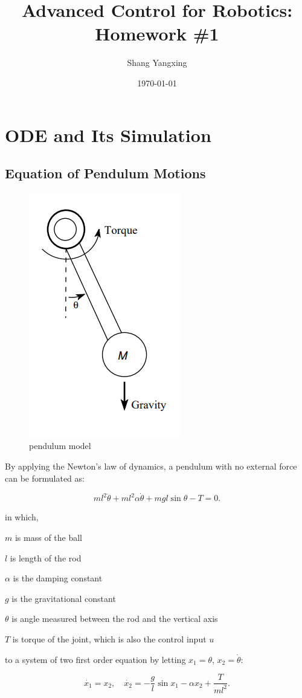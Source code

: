 \documentclass{article}
\title{\textbf{Advanced Control for Robotics: Homework \#1}}
\author{Shang Yangxing}
\date{\today}
\begin{document}
\maketitle
\tableofcontents

\section{ODE and Its Simulation}

\subsection{Equation of Pendulum Motions}

\begin{figure}[htbp]
    \centering
    \includegraphics[width=.2\textwidth]{img/pendulum.png}
    \caption{pendulum model}
    \label{fig:pendulum}
\end{figure}

By applying the Newton's law of dynamics, a pendulum with no external force can be formulated as:

\begin{equation}
    ml^2 \ddot{\theta} + ml^2 \alpha \dot{\theta} + mgl \sin{\theta} - T = 0.
\end{equation}

in which,

\quad $m$ is mass of the ball

\quad $l$ is length of the rod

\quad $\alpha$ is the damping constant

\quad $g$ is the gravitational constant

\quad $\theta$ is angle measured between the rod and the vertical axis

\quad $T$ is torque of the joint, which is also the control input $u$

to a system of two first order equation by letting $x_1=\theta$, $x_2=\dot{\theta}$:

\begin{equation}
    \dot{x_1} = x_2, \quad \dot{x_2} = - \frac{g}{l}\sin{x_1} -\alpha x_2 + \frac{T}{ml^2}.
\end{equation}
\end{document}
